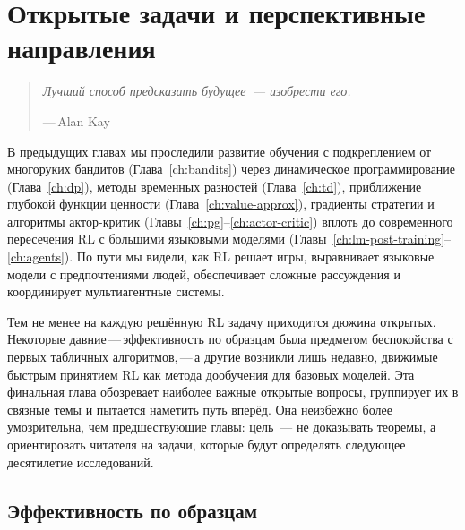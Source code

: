 
\chapter[Открытые задачи]{Открытые задачи и перспективные направления}
\label{ch:open}

\begin{quote}
\itshape
Лучший способ предсказать будущее~--- изобрести его.
\par\medskip
\upshape\raggedleft
---\,Alan Kay
\end{quote}

\bigskip

В предыдущих главах мы проследили развитие обучения с подкреплением от
многоруких бандитов (Глава~\ref{ch:bandits}) через динамическое
программирование (Глава~\ref{ch:dp}), методы временных разностей
(Глава~\ref{ch:td}), приближение глубокой функции ценности
(Глава~\ref{ch:value-approx}), градиенты стратегии и алгоритмы актор-критик
(Главы~\ref{ch:pg}--\ref{ch:actor-critic}) вплоть до
современного пересечения RL с большими языковыми моделями
(Главы~\ref{ch:lm-post-training}--\ref{ch:agents}). По пути
мы видели, как RL решает игры, выравнивает языковые модели с предпочтениями людей,
обеспечивает сложные рассуждения и координирует мультиагентные системы.

Тем не менее на каждую решённую RL задачу приходится дюжина открытых. Некоторые
давние\,---\,эффективность по образцам была предметом беспокойства с
первых табличных алгоритмов,\,---\,а другие возникли лишь
недавно, движимые быстрым принятием RL как метода дообучения
для базовых моделей. Эта финальная глава обозревает наиболее
важные открытые вопросы, группирует их в связные темы и
пытается наметить путь вперёд. Она неизбежно более умозрительна,
чем предшествующие главы: цель~--- не доказывать теоремы,
а ориентировать читателя на задачи, которые будут определять следующее
десятилетие исследований.


\section{Эффективность по образцам}
\label{sec:open-sample}

